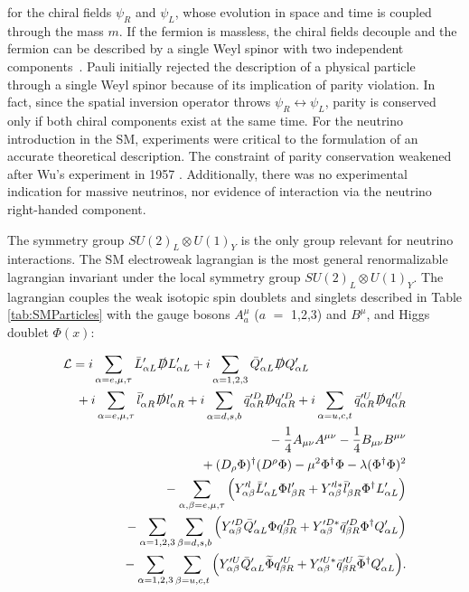 for the chiral fields $\psi_R$ and $\psi_L$, whose evolution in space and time is coupled through the mass $m$.
If the fermion is massless, the chiral fields decouple and the fermion can be described by a single Weyl spinor with two independent components~\cite{Weyl:10.2307}. Pauli initially rejected the description of a physical particle through a single Weyl spinor because of its implication of parity violation. In fact, since the spatial inversion operator throws $\psi_R \leftrightarrow \psi_L$, parity is conserved only if both chiral components exist at the same time.  For the neutrino introduction in the SM, experiments were critical to the formulation of an accurate theoretical description.  The constraint of parity conservation weakened after Wu's experiment in 1957 \cite{PhysRev.105.1413}. Additionally,  there was no experimental indication for massive neutrinos, nor evidence of interaction via the neutrino right-handed component.%

The symmetry group $SU(2)_L \otimes U(1)_Y$ is the only group relevant for neutrino interactions. The SM electroweak lagrangian is the most general renormalizable lagrangian invariant under the local symmetry group $SU(2)_L \otimes U(1)_Y$. The lagrangian couples the weak isotopic spin doublets and singlets described in Table \ref{tab:SMParticles} with the gauge bosons  $A^{\mu}_{a}$ ($a$ $=$ 1,2,3) and $B^{\mu}$, and Higgs doublet $\Phi(x)$:

\begin{eqnarray}
\lefteqn{\mathcal{L} = i\sum_{\alpha=e,\mu,\tau} \bar{L}'_{\alpha L}  \slashed D L'_{\alpha L} + 
 i\sum_{\alpha=1,2,3} \bar{Q}'_{\alpha L}  \slashed D Q'_{\alpha L} {}}
 \nonumber\\
 & & {} + i\sum_{\alpha=e,\mu,\tau} \bar{l}'_{\alpha R}  \slashed D l'_{\alpha R} + i\sum_{\alpha=d,s,b} \bar{q}'^D_{\alpha R}  \slashed D q'^D_{\alpha R} + i\sum_{\alpha=u,c,t} \bar{q}'^U_{\alpha R}  \slashed D q'^U_{\alpha R}
 \nonumber\\
 & & {} -\frac{1}{4}A_{\mu \nu}A^{\mu \nu} - \frac{1}{4}B_{\mu \nu}B^{\mu \nu}
 \nonumber\\
 & & {} +(D_{\rho}\Phi)^\dagger(D^{\rho}\Phi) - \mu^2\Phi^\dagger\Phi - \lambda(\Phi^\dagger\Phi)^2 
 \nonumber\\
 & & {} -\sum_{\alpha,\beta=e,\mu,\tau} \Big(Y'^l_{\alpha\beta}\bar{L}'_{\alpha L}  \Phi l'_{\beta R} + Y'^{l*}_{\alpha\beta}\bar{l}'_{\beta R}  \Phi^\dagger L'_{\alpha L}\Big)
  \nonumber\\
 & & {} -\sum_{\alpha=1,2,3} \sum_{\beta=d,s,b} \Big(Y'^D_{\alpha\beta}\bar{Q}'_{\alpha L}  \Phi q'^D_{\beta R} + Y'^{D*}_{\alpha\beta}\bar{q}'^D_{\beta R}  \Phi^\dagger Q'_{\alpha L}\Big)
  \nonumber\\
 & & {} -\sum_{\alpha=1,2,3} \sum_{\beta=u,c,t} \Big(Y'^U_{\alpha\beta}\bar{Q}'_{\alpha L}   \widetilde{\Phi} q'^U_{\beta R} + Y'^{U*}_{\alpha\beta}\bar{q}'^U_{\beta R} \widetilde{\Phi}^\dagger Q'_{\alpha L}\Big).
\end{eqnarray}

